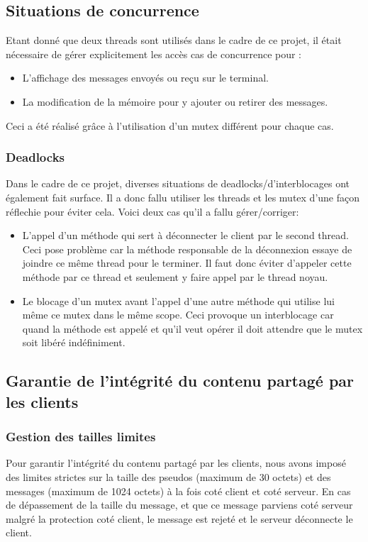 \documentclass{article}
\begin{document}
\subsection{Situations de concurrence}
Etant donné que deux threads sont utilisés dans le cadre de ce projet, il était nécessaire de gérer explicitement les accès cas de concurrence pour :
\begin{itemize}
    \item L'affichage des messages envoyés ou reçu sur le terminal.
    \item La modification de la mémoire pour y ajouter ou retirer des messages.
\end{itemize}
Ceci a été réalisé grâce à l'utilisation d'un mutex différent pour chaque cas.

\subsubsection*{Deadlocks}
Dans le cadre de ce projet, diverses situations de deadlocks/d'interblocages ont également fait surface. Il a donc fallu utiliser les threads et les mutex d'une façon réflechie pour éviter cela. Voici deux cas qu'il a fallu gérer/corriger:
\begin{itemize}
    \item L'appel d'un méthode qui sert à déconnecter le client par le second thread. Ceci pose problème car la méthode responsable de la déconnexion essaye de joindre ce même thread pour le terminer. Il faut donc éviter d'appeler cette méthode par ce thread et seulement y faire appel par le thread noyau.
    \item Le blocage d'un mutex avant l'appel d'une autre méthode qui utilise lui même ce mutex dans le même scope. Ceci provoque un interblocage car quand la méthode est appelé et qu'il veut opérer il doit attendre que le mutex soit libéré indéfiniment.
\end{itemize}



\subsection{Garantie de l'intégrité du contenu partagé par les clients}

\subsubsection{Gestion des tailles limites}

Pour garantir l'intégrité du contenu partagé par les clients, nous avons imposé des limites strictes sur la taille des pseudos (maximum de 30 octets) et des messages (maximum de 1024 octets) à la fois coté client et coté serveur. En cas de dépassement de la taille du message, et que ce message parviens coté serveur malgré la protection coté client, le message est rejeté et le serveur déconnecte le client. 
\end{document}
